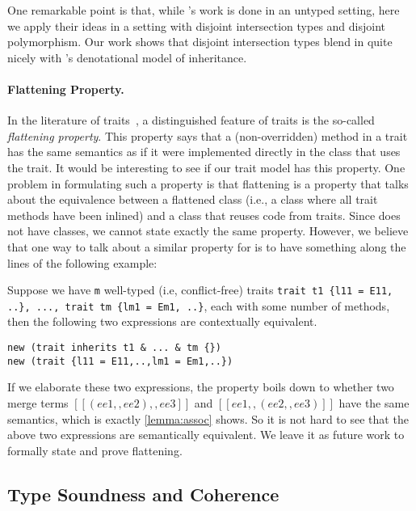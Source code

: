 One remarkable point is that, while \citeauthor{cook1989denotational}'s work is done in
an untyped setting, here we apply their ideas in a setting with
disjoint intersection types and disjoint polymorphism. Our work shows that
disjoint intersection types blend in quite nicely with \citeauthor{cook1989denotational}'s
denotational model of inheritance.

\paragraph{Flattening Property.}

In the literature of traits~\cite{Ducasse_2006, scharli2003traits, JOT:issue_2006_05/article4},
a distinguished feature of traits is the
so-called \textit{flattening property}. This property says that a (non-overridden) method in a
trait has the same semantics as if it were implemented directly in the class
that uses the trait. It would be interesting to see if our trait model has this
property. One problem in formulating such a property is that flattening is a
property that talks about the equivalence between a flattened class (i.e., a
class where all trait methods have been inlined) and a class that reuses code
from traits. Since \sedel does not have classes, we cannot state exactly the same
property. However, we believe that one way to talk about a similar property for \sedel is to have something
along the lines of the following example:
\begin{example}[Flattening]
  Suppose we have \lstinline$m$ well-typed (i.e, conflict-free) traits \lstinline$trait t1 {l11 = E11, ..}, ..., trait tm {lm1 = Em1, ..}$,
  each with some number of methods, then the following two expressions are contextually equivalent.
\begin{lstlisting}
new (trait inherits t1 & ... & tm {})
new (trait {l11 = E11,..,lm1 = Em1,..})
\end{lstlisting}
\end{example}
If we elaborate these two expressions, the property boils down to whether two
merge terms $[[(ee1 ,, ee2) ,, ee3]]$ and $[[ee1 ,, (ee2 ,, ee3)]]$ have the
same semantics, which is exactly \cref{lemma:assoc} shows. So it is not hard to
see that the above two expressions are semantically equivalent. We leave it as
future work to formally state and prove flattening.

\subsection{Type Soundness and Coherence}

